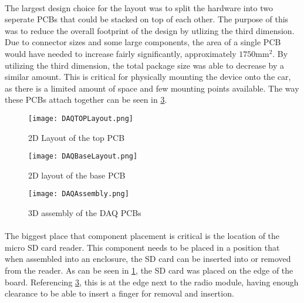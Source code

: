 \paragraph{}
The largest design choice for the layout was to split the hardware into two seperate PCBs that could be stacked on top of each other.
The purpose of this was to reduce the overall footprint of the design by utlizing the third dimension.
Due to connector sizes and some large components, the area of a single PCB would have needed to increase fairly significantly, approximately $1750\text{mm}^2$.  By utilizing the third dimension, the total package size was able to decrease by a similar amount.
This is critical for physically mounting the device onto the car, as there is a limited amount of space and few mounting points available.
The way these PCBs attach together can be seen in \cref{fig:PCBAssembly}.

\begin{figure}[H]
	\centering
	\texttt{[image: DAQTOPLayout.png]}
	\caption{2D Layout of the top PCB}
	\label{fig:TopLayout}
\end{figure}

\begin{figure}[H]
	\centering
	\texttt{[image: DAQBaseLayout.png]}
	\caption{2D layout of the base PCB}
	\label{fig:BaseLayout}
\end{figure}

\begin{figure}[H]
	\centering
	\texttt{[image: DAQAssembly.png]}
	\caption{3D assembly of the DAQ PCBs}
	\label{fig:PCBAssembly}
\end{figure}

\paragraph{}
The biggest place that component placement is critical is the location of the micro SD card reader.
This component needs to be placed in a position that when assembled into an enclosure, the SD card can be inserted into or removed from the reader.
As can be seen in \cref{fig:TopLayout}, the SD card was placed on the edge of the board.
Referencing \cref{fig:PCBAssembly}, this is at the edge next to the radio module, having enough clearance to be able to insert a finger for removal and insertion.